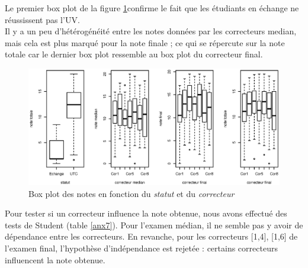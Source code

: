\documentclass{article}
\begin{document}
Le premier box plot de la figure \lbrack\ref{anx3}\rbrack confirme le fait que les étudiants en échange ne réussissent pas l'UV.\\
Il y a un peu d'hétérogénéité entre les notes données par les correcteurs median, mais cela est plus marqué pour la note finale ; ce qui se répercute sur la note totale car le dernier box plot ressemble au box plot du correcteur final.
\begin{figure}[!ht]
\begin{center}
\includegraphics[scale=0.52]{./img/boxplot_par_1-3_2.eps}
\caption{Box plot des notes en fonction du \textit{statut} et du \textit{correcteur}}
\label{anx3}
\end{center}
\end{figure}

Pour tester si un correcteur influence la note obtenue, nous avons effectué des tests de Student (table \ref{anx7}). Pour l'examen médian, il ne semble pas y avoir de dépendance entre les correcteurs. En revanche, pour les correcteurs [1,4], [1,6] de l'examen final, l'hypothèse d'indépendance est rejetée : certains correcteurs influencent la note obtenue.
\end{document}
